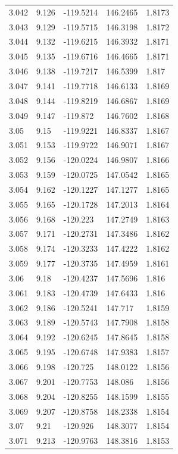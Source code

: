 \begin{tabular}{lllll}
3.042 & 9.126 & -119.5214 & 146.2465 & 1.8173 \\
3.043 & 9.129 & -119.5715 & 146.3198 & 1.8172 \\
3.044 & 9.132 & -119.6215 & 146.3932 & 1.8171 \\
3.045 & 9.135 & -119.6716 & 146.4665 & 1.8171 \\
3.046 & 9.138 & -119.7217 & 146.5399 & 1.817 \\
3.047 & 9.141 & -119.7718 & 146.6133 & 1.8169 \\
3.048 & 9.144 & -119.8219 & 146.6867 & 1.8169 \\
3.049 & 9.147 & -119.872 & 146.7602 & 1.8168 \\
3.05 & 9.15 & -119.9221 & 146.8337 & 1.8167 \\
3.051 & 9.153 & -119.9722 & 146.9071 & 1.8167 \\
3.052 & 9.156 & -120.0224 & 146.9807 & 1.8166 \\
3.053 & 9.159 & -120.0725 & 147.0542 & 1.8165 \\
3.054 & 9.162 & -120.1227 & 147.1277 & 1.8165 \\
3.055 & 9.165 & -120.1728 & 147.2013 & 1.8164 \\
3.056 & 9.168 & -120.223 & 147.2749 & 1.8163 \\
3.057 & 9.171 & -120.2731 & 147.3486 & 1.8162 \\
3.058 & 9.174 & -120.3233 & 147.4222 & 1.8162 \\
3.059 & 9.177 & -120.3735 & 147.4959 & 1.8161 \\
3.06 & 9.18 & -120.4237 & 147.5696 & 1.816 \\
3.061 & 9.183 & -120.4739 & 147.6433 & 1.816 \\
3.062 & 9.186 & -120.5241 & 147.717 & 1.8159 \\
3.063 & 9.189 & -120.5743 & 147.7908 & 1.8158 \\
3.064 & 9.192 & -120.6245 & 147.8645 & 1.8158 \\
3.065 & 9.195 & -120.6748 & 147.9383 & 1.8157 \\
3.066 & 9.198 & -120.725 & 148.0122 & 1.8156 \\
3.067 & 9.201 & -120.7753 & 148.086 & 1.8156 \\
3.068 & 9.204 & -120.8255 & 148.1599 & 1.8155 \\
3.069 & 9.207 & -120.8758 & 148.2338 & 1.8154 \\
3.07 & 9.21 & -120.926 & 148.3077 & 1.8154 \\
3.071 & 9.213 & -120.9763 & 148.3816 & 1.8153 \\

\end{tabular}
